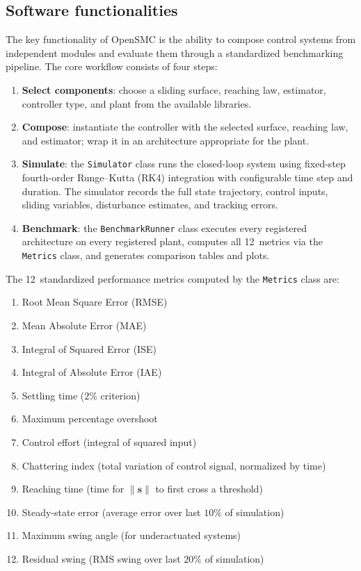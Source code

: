 \documentclass[preprint,12pt]{elsarticle}
\begin{document}
\subsection{Software functionalities}
\label{sec:functionalities}

The key functionality of OpenSMC is the ability to compose control systems from independent modules and evaluate them through a standardized benchmarking pipeline. The core workflow consists of four steps:

\begin{enumerate}
    \item \textbf{Select components}: choose a sliding surface, reaching law, estimator, controller type, and plant from the available libraries.
    \item \textbf{Compose}: instantiate the controller with the selected surface, reaching law, and estimator; wrap it in an architecture appropriate for the plant.
    \item \textbf{Simulate}: the \texttt{Simulator} class runs the closed-loop system using fixed-step fourth-order Runge--Kutta (RK4) integration with configurable time step and duration. The simulator records the full state trajectory, control inputs, sliding variables, disturbance estimates, and tracking errors.
    \item \textbf{Benchmark}: the \texttt{BenchmarkRunner} class executes every registered architecture on every registered plant, computes all 12~metrics via the \texttt{Metrics} class, and generates comparison tables and plots.
\end{enumerate}

The 12~standardized performance metrics computed by the \texttt{Metrics} class are:
\begin{enumerate}
    \item Root Mean Square Error (RMSE)
    \item Mean Absolute Error (MAE)
    \item Integral of Squared Error (ISE)
    \item Integral of Absolute Error (IAE)
    \item Settling time ($2\%$ criterion)
    \item Maximum percentage overshoot
    \item Control effort (integral of squared input)
    \item Chattering index (total variation of control signal, normalized by time)
    \item Reaching time (time for $\|\mathbf{s}\|$ to first cross a threshold)
    \item Steady-state error (average error over last $10\%$ of simulation)
    \item Maximum swing angle (for underactuated systems)
    \item Residual swing (RMS swing over last $20\%$ of simulation)
\end{enumerate}
\end{document}
